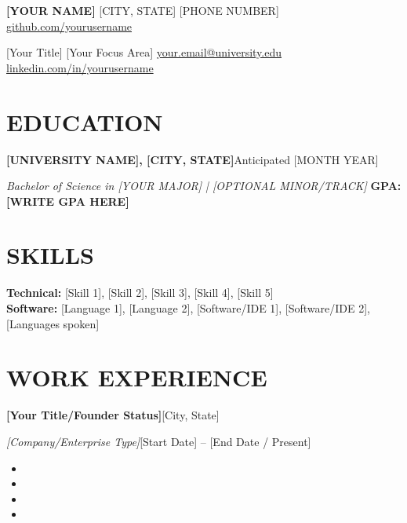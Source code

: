 \documentclass[10pt,letterpaper]{article}
\newenvironment{resumeentry}[2]{%
\vspace{1pt}\textbf{#1}\hfill {\small #2}\par
}{\vspace{0pt}}
\newenvironment{resumeentrywide}[4]{%
\vspace{1pt}\textbf{#1}\hfill {\small #2}\par
\textit{#3}\hfill {\small #4}\par
}{\vspace{0pt}}
\begin{document}
\pagestyle{empty}

\noindent
{\Large \textsc{\textbf{[YOUR NAME]}}} \hfill [CITY, STATE] \textbar{} [PHONE NUMBER] \textbar{} \href{https://github.com/yourusername}{github.com/yourusername}\par
\vspace{2pt}
[Your Title] \textbar{} [Your Focus Area] \hfill \href{mailto:your.email@university.edu}{your.email@university.edu} \textbar{} \href{https://www.linkedin.com/in/yourusername}{linkedin.com/in/yourusername}
\vspace{8pt}

\section*{EDUCATION}
\begin{resumeentry}{[UNIVERSITY NAME], [CITY, STATE]}{Anticipated [MONTH YEAR]}\end{resumeentry}
\textit{Bachelor of Science in [YOUR MAJOR] | [OPTIONAL MINOR/TRACK]} \hfill \textbf{GPA: [WRITE GPA HERE]}

\section*{SKILLS}
\textbf{Technical:} [Skill 1], [Skill 2], [Skill 3], [Skill 4], [Skill 5] \\
\textbf{Software:} [Language 1], [Language 2], [Software/IDE 1], [Software/IDE 2], [Languages spoken]

\section*{WORK EXPERIENCE}

\begin{resumeentrywide}
{[Your Title/Founder Status]}{[City, State]}
{[Company/Enterprise Type]}{[Start Date] – [End Date / Present]}
\end{resumeentrywide}
\begin{itemize}
\item 
\item 
\item 
\item 
\end{itemize}
\vspace{6pt}
\end{document}
